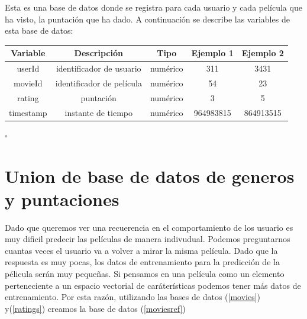 \begin{db}\label{ratings}
    Esta es una base de datos donde se registra para cada usuario y cada película que ha visto, la puntación que ha dado. A continuación se describe las variables de esta base de datos:
    \begin{center}
        \begin{tabular}{|c|c|c|c|c|}
        \hline
        \textbf{Variable} & \textbf{Descripción} & \textbf{Tipo} & \textbf{Ejemplo 1} & \textbf{Ejemplo 2} \\ 
        \hline
         userId & identificador de usuario   & numérico & 311 & 3431 \\  
        \hline
         movieId & identificador de película & numérico & 54 & 23 \\
        \hline
         rating & puntación  & numérico & 3 & 5 \\
        \hline
        timestamp & instante de tiempo  & numérico & 964983815 & 864913515 \\        
         \hline
        \end{tabular}
    \end{center} 
    \hfill$\square$
\end{db}

\section{Union de base de datos de generos y puntaciones}
Dado que queremos ver una recuerencia en el comportamiento de los usuario es muy dificil predecir las películas de manera indivudual. Podemos preguntarnos cuantas veces el usuario va a volver a mirar la misma película. Dado que la respuesta es muy pocas, los datos de entrenamiento para la predicción de la pélicula serán muy pequeñas. Si pensamos en una película como un elemento perteneciente a un espacio vectorial de caráterísticas podemos tener más datos de entrenamiento. Por esta razón, utilizando las bases de datos (\ref{movies}) y(\ref{ratings}) creamos la base de datos (\ref{moviesref})

